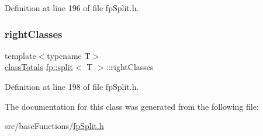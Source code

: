 Definition at line 196 of file fp\+Split.\+h.

\mbox{\label{classfp_1_1split_af5366297f7de9b8ff0911186300bab7e}} 
\subsubsection{\texorpdfstring{right\+Classes}{rightClasses}}
{\footnotesize\ttfamily template$<$typename T$>$ \\
\hyperlink{classfp_1_1classTotals}{class\+Totals} \hyperlink{classfp_1_1split}{fp\+::split}$<$ T $>$\+::right\+Classes\hspace{0.3cm}{\ttfamily [protected]}}



Definition at line 198 of file fp\+Split.\+h.



The documentation for this class was generated from the following file\+:\begin{DoxyCompactItemize}
\item 
src/base\+Functions/\hyperlink{fpSplit_8h}{fp\+Split.\+h}\end{DoxyCompactItemize}
